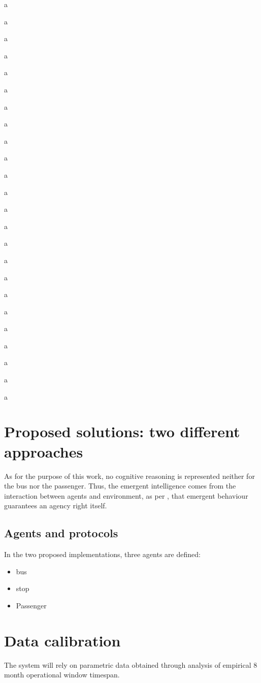 \documentclass[a4paper,fleqn]{cas-sc}
\begin{document}
a

a

a

a

a

a

a

a

a

a

a

a

a

a

a

a

a

a

a

a

a

a

a

a


\section{Proposed solutions: two different approaches}\label{}

As for the purpose of this work, no cognitive reasoning is represented neither for the bus nor the passenger.
Thus, the emergent intelligence comes from the interaction between agents and environment, as per
\citet{brooks1991representation}, that emergent behaviour guarantees an agency right itself.

\subsection{Agents and protocols}
In the two proposed implementations, three agents are defined:

\begin{itemize}
  \item bus
  \item stop
  \item Passenger
\end{itemize}


\section{Data calibration}

The system will rely on parametric data obtained through analysis of empirical 8 month operational window timespan.
\end{document}
